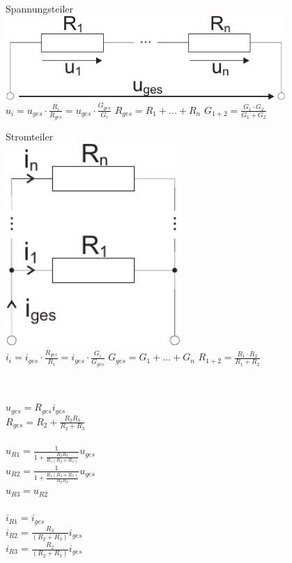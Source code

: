 \documentclass[a4paper,twocolumn,10pt]{article}
\begin{document}
\begin{minipage}[t]{0.23\textwidth}
\centering
Spannungsteiler\\
\vspace{0.3 cm}
\includegraphics[width=0.8\textwidth]{img/Spannungsteiler}\\
\vspace{0.5 cm}
$u_i=u_{ges}\cdot \frac{R_i}{R_{ges}}=u_{ges}\cdot \frac{G_{ges}}{G_i}$
$R_{ges}=R_1+...+R_n$
$G_{1+2}=\frac{G_1\cdot G_2}{G_1+G_2}$
\end{minipage}
\hfill
\begin{minipage}[t]{0.23\textwidth}
\centering
Stromteiler\\
\vspace{0.3 cm}
\includegraphics[width=0.5\textwidth]{img/Stromteiler}\\
\vspace{0.5 cm}
$i_i=i_{ges}\cdot \frac{R_{ges}}{R_i}=i_{ges}\cdot \frac{G_i}{G_{ges}}$
$G_{ges}=G_1+...+G_n$
$R_{1+2}=\frac{R_1\cdot R_2}{R_1+R_2}$
\end{minipage}
\\
\begin{minipage}{0.20\textwidth}
	$u_{ges}=R_{ges}i_{ges}$\\
	$R_{ges}=R_2+\frac{R_2R_3}{R_2+R_3}$\\\\
	$u_{R1}=\frac{1}{1+\frac{R_2 R_3}{R_1(R_2 + R_3)}}u_{ges}$\\
	$u_{R2}=\frac{1}{1+\frac{R_1(R_2+R_3)}{R_2R_3}}u_{ges}$\\
	$u_{R3}=u_{R2}$
	\\\\
	$i_{R1}=i_{ges}$\\
	$i_{R2}=\frac{R_3}{(R_2+R_3)}i_{ges}$\\
	$i_{R3}=\frac{R_2}{(R_2+R_3)}i_{ges}$
\end{minipage}
\end{document}

